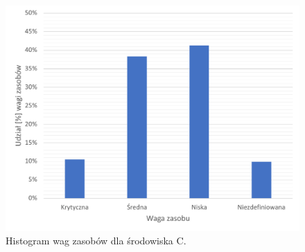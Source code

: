 \begin{figure}[!ht]
\centering
\includegraphics[width=.7\textwidth]{Chapters/Srodowiska/env_C/os_cia.pdf}
\caption{Histogram wag zasobów dla środowiska C.}
\label{fig:chapter5:env_c:os_cia}
\end{figure}


